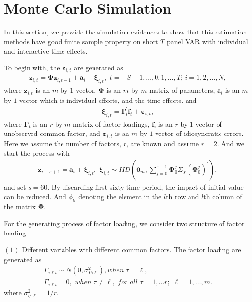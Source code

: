 \documentclass[12pt,a4paper,hyperref]{article}
\begin{document}
\section{Monte Carlo Simulation}
In this section, we provide the simulation evidences to show that this estimation methods  have good finite sample property on short $T$ panel VAR with individual and interactive time  effects.

To begin with, the $\boldsymbol{z}_{i,t}$ are generated as
\begin{align}
\boldsymbol{z}_{i,t}=\boldsymbol{\Phi} \boldsymbol{z}_{i,t-1}+\boldsymbol{a}_{i}+ \boldsymbol{\xi}_{i,t},\,\, t=-S+1,\ldots, 0,1,\ldots,T; \, i=1,2,\ldots,N,
\end{align}
where $\boldsymbol{z}_{i,t}$ is an $m$ by $1$ vector, $\boldsymbol{\Phi}$ is an $m$ by $m$ matrix of parameters, $\boldsymbol{a}_{i}$ is an $m$ by $1$ vector which is individual effects, and the time effects.
and
\begin{align}
\boldsymbol{\xi}_{i,t}=\boldsymbol{\Gamma}^{'}_{i}\boldsymbol{f}_{t}+\boldsymbol{\varepsilon}_{i,t},
\end{align}
where  $\boldsymbol{\Gamma}_{t}$ is an $r$ by $m$ matrix of factor loadings, $\boldsymbol{f}_{i}$ is  an $r$ by $1$ vector of unobserved common factor, and $\boldsymbol{\varepsilon}_{i,t}$ is an $m$ by $1$ vector of idiosyncratic errors.
Here we assume the number of factors, $r$, are known and assume $r=2$.
And we start the process with
\begin{align}
\boldsymbol{z}_{i,-s+1}=\boldsymbol{a}_{i}+\boldsymbol{\xi}_{i,t},\,\, \boldsymbol{\xi}_{i,t}\sim IID \left(\boldsymbol{0}_{m}, \sum^{s-1}_{j=0}\boldsymbol{\Phi}^{j}_{0}\Sigma_{\chi}(\boldsymbol{\Phi}^{j}_{0})^{'}  \right),
\end{align}
and set $s=60$. By discarding first sixty time period, the impact of initial value can be reduced. And $\phi_{ll}$ denoting the element in the $l$th row and $l$th column of the matrix $\boldsymbol{\Phi}.$


For the generating process of factor loading, we consider two structure of factor loading.

$(1)$  Different variables with different common factors. The factor loading are generated as
\begin{align*}
\Gamma_{\tau \ell i}\sim N\left(0,\sigma^{2}_{\Gamma \tau \ell}  \right), when\,\,\tau = \ell , \\
\Gamma_{\tau \ell i}=0 ,\,\, when\,\,\tau \neq \ell, \,\, for \,\, all \,\,\tau=1,\ldots r ;\,\, \ell=1,\ldots, m.
\end{align*}
where $\sigma^{2}_{\eta \tau \ell}=1/r$.
\end{document}
